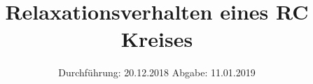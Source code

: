

\subject{V353}
\title{Relaxationsverhalten eines RC Kreises}
\date{
  Durchführung: 20.12.2018
  \hspace{3em}
  Abgabe: 11.01.2019
}



\maketitle
\thispagestyle{empty}
\tableofcontents
\newpage






\printbibliography{}

